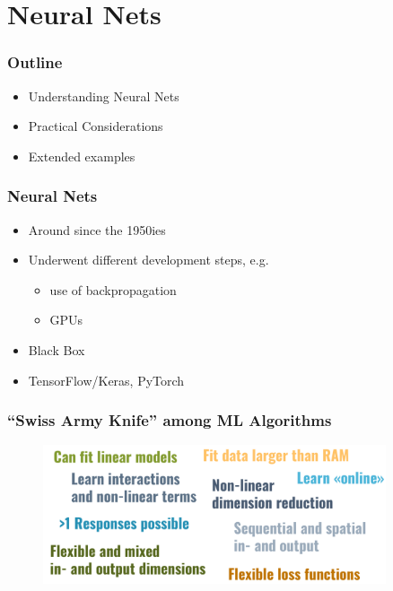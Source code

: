 \section{Neural Nets}

\begin{frame}
	\frametitle{Outline}
	
	\begin{itemize}
		\item Understanding Neural Nets
		\item Practical Considerations
		\item Extended examples
	\end{itemize}
\end{frame}

\begin{frame}
	\frametitle{Neural Nets}
	\begin{itemize}
		\item Around since the 1950ies
		\item Underwent different development steps, e.g.
		\begin{itemize}
			\item use of backpropagation
			\item GPUs
		\end{itemize}
		\item Black Box
		\item TensorFlow/Keras, PyTorch
	\end{itemize}
\end{frame}

\begin{frame}
	\frametitle{``Swiss Army Knife'' among ML Algorithms}
	\begin{figure}
		\includegraphics[width=0.9\textwidth]{pics/nn_knife.png}
	\end{figure}
\end{frame}

